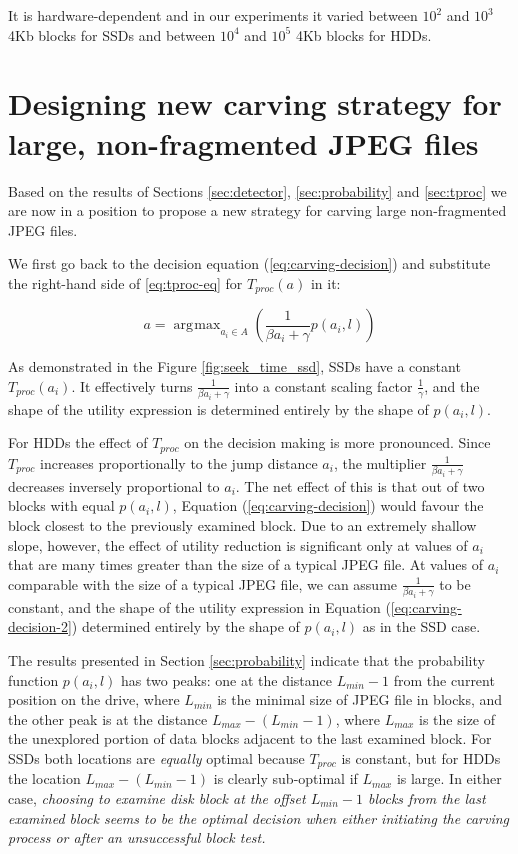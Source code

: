 \documentclass[final,5p,times,twocolumn,authoryear]{elsarticle}
\DeclareMathOperator*{\argmax}{\arg\!\max}
\begin{document}
It is hardware-dependent and in our experiments it varied between $10^2$ and $10^3$ 4Kb blocks for SSDs and between $10^4$ and $10^5$ 4Kb blocks for HDDs.

\section{Designing new carving strategy for large, non-fragmented JPEG files}
\label{sec:decision}

Based on the results of Sections \ref{sec:detector}, \ref{sec:probability} and \ref{sec:tproc} we are now in a position to propose a new strategy for carving large non-fragmented JPEG files.

We first go back to the decision equation (\ref{eq:carving-decision}) and substitute the right-hand side of \ref{eq:tproc-eq} for $T_{proc}(a)$ in it: 

\begin{equation} \label{eq:carving-decision-2}
a = \argmax_{a_i \in A} \left( \frac{1}{\beta a_i + \gamma} p(a_i,l)\right)
\end{equation}

As demonstrated in the Figure \ref{fig:seek_time_ssd}, SSDs have a constant $T_{proc}(a_i)$. It effectively turns $\frac{1}{\beta a_i + \gamma}$ into a constant scaling factor $\frac{1}{\gamma}$, and the shape of the utility expression is determined entirely by the shape of $p(a_i,l)$.

For HDDs the effect of $T_{proc}$ on the decision making is more pronounced. Since $T_{proc}$ increases proportionally to the jump distance $a_i$, the multiplier $\frac{1}{\beta a_i + \gamma}$ decreases inversely proportional to $a_i$. The net effect of this is that out of two blocks with equal $p(a_i,l)$,  Equation (\ref{eq:carving-decision}) would favour the block closest to the previously examined block. Due to an extremely shallow slope, however, the effect of utility reduction is significant only at values of $a_i$ that are many times greater than the size of a typical JPEG file. At values of $a_i$ comparable with the size of a typical JPEG file, we can assume $\frac{1}{\beta a_i + \gamma}$ to be constant, and the shape of the utility expression in Equation (\ref{eq:carving-decision-2}) determined entirely by the shape of $p(a_i,l)$ as in the SSD case.

The results presented in Section \ref{sec:probability} indicate that the probability function $p(a_i,l)$ has two peaks: one at the distance $L_{min}-1$ from the current position on the drive, where $L_{min}$ is the minimal size of JPEG file in blocks, and the other peak is at the distance $L_{max}-(L_{min}-1)$, where $L_{max}$ is the size of the unexplored portion of data blocks adjacent to the last examined block. For SSDs both locations are \emph{equally} optimal because $T_{proc}$ is constant, but for HDDs the location $L_{max}-(L_{min}-1)$ is clearly sub-optimal if $L_{max}$ is large. In either case, \emph{choosing to examine disk block at the offset $L_{min}-1$ blocks from the last examined block seems to be the optimal decision when either initiating the carving process or after an unsuccessful block test.}
\end{document}
